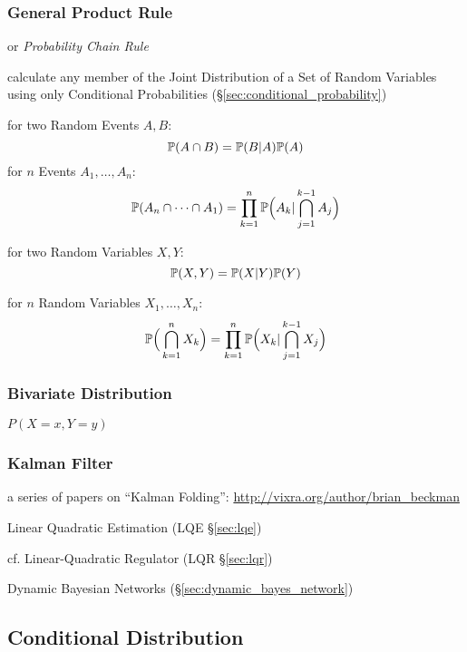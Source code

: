\subsubsection{General Product Rule}\label{sec:general_product_rule}

or \emph{Probability Chain Rule}

calculate any member of the Joint Distribution of a Set of Random Variables
using only Conditional Probabilities (\S\ref{sec:conditional_probability})

for two Random Events $A, B$:
\[
  \mathbb{P}(A \cap B) = \mathbb{P}(B | A) \mathbb{P}(A)
\]
for $n$ Events $A_1, \ldots, A_n$:
\[
  \mathbb{P}(A_n \cap \cdots \cap A_1) =
    \prod_{k=1}^n \mathbb{P}\Big(A_k | \bigcap_{j=1}^{k-1} A_j \Big)
\]

for two Random Variables $X, Y$:
\[
  \mathbb{P}(X, Y) = \mathbb{P}(X | Y) \mathbb{P}(Y)
\]

for $n$ Random Variables $X_1, \ldots, X_n$:
\[
  \mathbb{P}\Big(\bigcap_{k=1}^n X_k\Big) =
    \prod_{k=1}^n \mathbb{P}\Big(X_k | \bigcap_{j=1}^{k-1} X_j\Big)
\]



\subsubsection{Bivariate Distribution}\label{sec:bivariate_distribution}

$P(X = x, Y = y)$



\subsubsection{Kalman Filter}\label{sec:kalman_filter}

a series of papers on ``Kalman Folding'':
\url{http://vixra.org/author/brian_beckman}

Linear Quadratic Estimation (LQE \S\ref{sec:lqe})

cf. Linear-Quadratic Regulator (LQR \S\ref{sec:lqr})

\fist Dynamic Bayesian Networks (\S\ref{sec:dynamic_bayes_network})



\subsection{Conditional Distribution}\label{sec:conditional_distribution}

